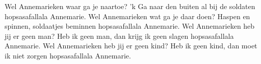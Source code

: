 \beginverse*
Wel Annemarieken waar ga je naartoe? 
'k Ga naar den buiten al bij de soldaten hopsasafallala Annemarie. 
\endverse
\beginverse*
Wel Annemarieken wat ga je daar doen? 
Haspen en spinnen, soldaatjes beminnen hopsasafallala Annemarie. 
\endverse
\beginverse*
Wel Annemarieken heb jij er geen man? 
Heb ik geen man, dan krijg ik geen slagen hopsasafallala Annemarie. 
\endverse
\beginverse*
Wel Annemarieken heb jij er geen kind? 
Heb ik geen kind, dan moet ik niet zorgen hopsasafallala Annemarie. 
\endverse
\endsong